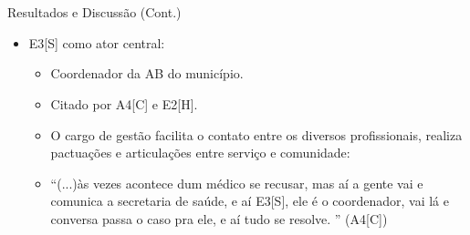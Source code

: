 \documentclass[10pt]{beamer}
\begin{document}
\section{}
\subsection{}
\begin{frame}{Resultados e Discussão (Cont.)}{}
  \begin{itemize}
    \item E3[S] como ator central:
    \begin{itemize}
    	\item Coordenador da AB do município.
    	\item Citado por A4[C] e E2[H].
    	\item O cargo de gestão facilita o contato entre os diversos profissionais, realiza pactuações e articulações entre serviço e comunidade:
	\item ``(...)às vezes acontece dum médico se recusar, mas aí a gente vai e comunica a secretaria de saúde, e aí E3[S], ele é o coordenador, vai lá e conversa passa o caso pra ele, e aí tudo se resolve.
'' (A4[C])
    \end{itemize}
  \end{itemize}
\end{frame}

\section{}
\end{document}
